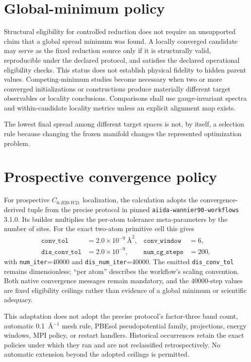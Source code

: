 \documentclass[11pt]{article}
\begin{document}
\section{Global-minimum policy}

Structural eligibility for controlled reduction does not require an unsupported claim
that a global spread minimum was found.  A locally converged candidate may serve as the
fixed reduction source only if it is structurally valid, reproducible under the declared
protocol, and satisfies the declared operational eligibility checks.  This status does
not establish physical fidelity to hidden parent values.  Competing-minimum studies
become necessary when two
or more converged initializations or constructions produce materially different target
observables or locality conclusions.  Comparisons shall use gauge-invariant spectra and
within-candidate locality metrics unless an explicit alignment map exists.

The lowest final spread among different target spaces is not, by itself, a selection
rule because changing the frozen manifold changes the represented optimization problem.

\section{Prospective convergence policy}

For prospective $C_{6\text{-}B20\text{-}W21}$ localization, the calculation adopts
the convergence-derived tuple from the precise protocol in pinned
\texttt{aiida-wannier90-workflows} 3.1.0.  Its builder multiplies the per-atom tolerance
meta-parameters by the number of sites.  For the exact two-atom primitive cell this
gives
\begin{align}
  \texttt{conv\_tol} &= 2.0\times10^{-9}\ \text{\AA}^{2}, &
  \texttt{conv\_window} &= 6, \\
  \texttt{dis\_conv\_tol} &= 2.0\times10^{-9}, &
  \texttt{num\_cg\_steps} &= 200,
\end{align}
with \texttt{num\_iter}=40000 and \texttt{dis\_num\_iter}=40000.  The emitted
\texttt{dis\_conv\_tol} remains dimensionless; ``per atom'' describes the workflow's
scaling convention.  Both native convergence messages remain mandatory, and the
40000-step values are fixed eligibility ceilings rather than evidence of a global
minimum or scientific adequacy.

This adaptation does not adopt the precise protocol's factor-three band count,
automatic 0.1~\AA$^{-1}$ mesh rule, PBEsol pseudopotential family, projections, energy
windows, MPI policy, or restart handlers.  Historical occurrences retain the exact
policies under which they ran and are not reclassified retrospectively.  No automatic
extension beyond the adopted ceilings is permitted.
\end{document}
